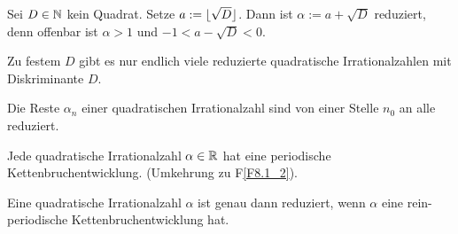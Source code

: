 	Sei $D \in \mathbb{N}$ kein Quadrat. Setze $a := \lfloor\sqrt{D}\rfloor$. Dann ist $\alpha := a + \sqrt{D}$ reduziert, denn offenbar ist $\alpha > 1$ und $-1 <  a - \sqrt{D} < 0$.
	
\begin{lemma} \label{lemma_8.2}
	Zu festem $D$ gibt es nur endlich viele reduzierte quadratische Irrationalzahlen mit Diskriminante $D$.
\end{lemma}

\begin{lemma} \label{lemma_8.3}
	Die Reste $\alpha_n$ einer quadratischen Irrationalzahl sind von einer Stelle $n_0$ an alle reduziert.
\end{lemma}

\begin{satz} \label{satz_8.2_2}
	Jede quadratische Irrationalzahl $\alpha \in \mathbb{R}$ hat eine periodische Kettenbruchentwicklung. (Umkehrung zu F\ref{F8.1_2}).
\end{satz}

	Eine quadratische Irrationalzahl $\alpha$ ist genau dann reduziert, wenn $\alpha$ eine rein-periodische Kettenbruchentwicklung hat.
\cleardoubleemptypage